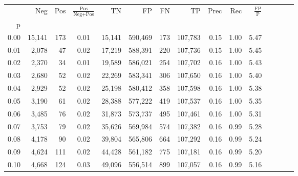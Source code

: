 \begin{tabular}{rrrcrrrrrrrrrrr}
\toprule
{} &     Neg &    Pos & $\frac{\text{Pos}}{\text{Neg}+\text{Pos}}$ &       TN &       FP &       FN &       TP &  Prec &   Rec & $\frac{\text{FP}}{\text{P}}$ \\
p    &         &        &                                            &          &          &          &          &       &       &                              \\
\midrule
0.00 &  15,141 &    173 &                                       0.01 &   15,141 &  590,469 &      173 &  107,783 &  0.15 &  1.00 &                         5.47 \\
0.01 &   2,078 &     47 &                                       0.02 &   17,219 &  588,391 &      220 &  107,736 &  0.15 &  1.00 &                         5.45 \\
0.02 &   2,370 &     34 &                                       0.01 &   19,589 &  586,021 &      254 &  107,702 &  0.16 &  1.00 &                         5.43 \\
0.03 &   2,680 &     52 &                                       0.02 &   22,269 &  583,341 &      306 &  107,650 &  0.16 &  1.00 &                         5.40 \\
0.04 &   2,929 &     52 &                                       0.02 &   25,198 &  580,412 &      358 &  107,598 &  0.16 &  1.00 &                         5.38 \\
0.05 &   3,190 &     61 &                                       0.02 &   28,388 &  577,222 &      419 &  107,537 &  0.16 &  1.00 &                         5.35 \\
0.06 &   3,485 &     76 &                                       0.02 &   31,873 &  573,737 &      495 &  107,461 &  0.16 &  1.00 &                         5.31 \\
0.07 &   3,753 &     79 &                                       0.02 &   35,626 &  569,984 &      574 &  107,382 &  0.16 &  0.99 &                         5.28 \\
0.08 &   4,178 &     90 &                                       0.02 &   39,804 &  565,806 &      664 &  107,292 &  0.16 &  0.99 &                         5.24 \\
0.09 &   4,624 &    111 &                                       0.02 &   44,428 &  561,182 &      775 &  107,181 &  0.16 &  0.99 &                         5.20 \\
0.10 &   4,668 &    124 &                                       0.03 &   49,096 &  556,514 &      899 &  107,057 &  0.16 &  0.99 &                         5.16 \\

\end{tabular}
